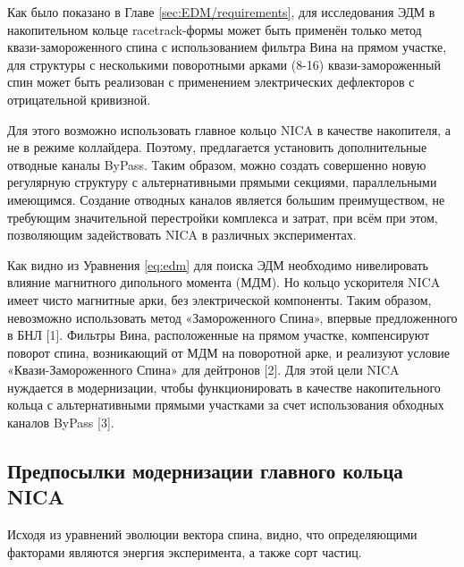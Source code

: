 \par Как было показано в Главе \ref{sec:EDM/requirements}, для исследования ЭДМ в накопительном кольце racetrack-формы может быть применён только метод квази-замороженного спина с использованием фильтра Вина на прямом участке, для структуры с несколькими поворотными арками (8-16) квази-замороженный спин может быть реализован с применением электрических дефлекторов с отрицательной кривизной.

\par Для этого возможно использовать главное кольцо NICA в качестве накопителя, а не в режиме коллайдера. Поэтому, предлагается установить дополнительные отводные каналы ByPass. Таким образом, можно создать совершенно новую регулярную структуру с альтернативными прямыми секциями, параллельными имеющимся. Создание отводных каналов является большим преимуществом, не требующим значительной перестройки комплекса и затрат, при всём при этом, позволяющим задействовать NICA в различных экспериментах.

\par Как видно из Уравнения \ref{eq:edm} для поиска ЭДМ необходимо нивелировать влияние магнитного дипольного момента (МДМ). Но кольцо ускорителя NICA имеет чисто магнитные арки, без электрической компоненты. Таким образом, невозможно использовать метод «Замороженного Спина», впервые предложенного в БНЛ [1]. Фильтры Вина, расположенные на прямом участке, компенсируют поворот спина, возникающий от МДМ на поворотной арке, и реализуют условие «Квази-Замороженного Спина» для дейтронов [2]. Для этой цели NICA нуждается в модернизации, чтобы функционировать в качестве накопительного кольца с альтернативными прямыми участками за счет использования обходных каналов ByPass [3].

	\subsection{Предпосылки модернизации главного кольца NICA}\label{sec:EDM/Wien_filter/modernization}

\par Исходя из уравнений эволюции вектора спина, видно, что определяющими факторами являются энергия эксперимента, а также сорт частиц.

